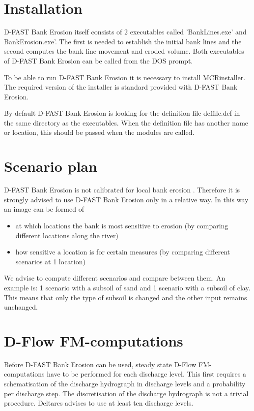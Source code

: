 \section{Installation}

D-FAST Bank Erosion itself consists of 2 executables called 'BankLines.exe' and BankErosion.exe'.
The first is needed to establish the initial bank lines and the second computes the bank line movement and eroded volume.
Both executables of D-FAST Bank Erosion can be called from the DOS prompt.

To be able to run D-FAST Bank Erosion it is necessary to install MCRinstaller.
The required version of the installer is standard provided with D-FAST Bank Erosion.

By default D-FAST Bank Erosion is looking for the definition file deffile.def in the same directory as the executables.
When the definition file has another name or location, this should be passed when the modules are called.

\section{Scenario plan}

D-FAST Bank Erosion is not calibrated for local bank erosion .
Therefore it is strongly advised to use D-FAST Bank Erosion only in a relative way.
In this way an image can be formed of

\begin{itemize}
\item at which locations the bank is most sensitive to erosion (by comparing different locations along the river)
\item how sensitive a location is for certain measures (by comparing different scenarios at 1 location)
\end{itemize}

We advise to compute different scenarios and compare between them.
An example is: 1 scenario with a subsoil of sand and 1 scenario with a subsoil of clay.
This means that only the type of subsoil is changed and the other input remains unchanged.

\section{D-Flow FM-computations}

Before D-FAST Bank Erosion can be used, steady state D-Flow FM-computations  have to be performed for each discharge level.
This first requires a schematisation of the discharge hydrograph in discharge levels and a probability per discharge step.
The discretisation of the discharge hydrograph is not a trivial procedure.
Deltares advises to use at least ten discharge levels.

